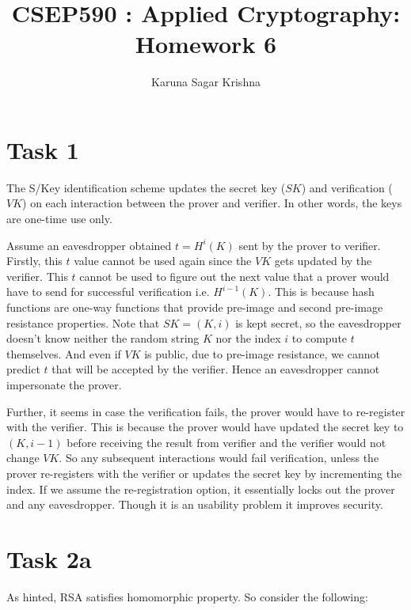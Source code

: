 \documentclass{article}
\title{CSEP590 : Applied Cryptography: Homework 6}
\author{Karuna Sagar Krishna}
\begin{document}
    \maketitle

    \section*{Task 1}
    The S/Key identification scheme updates the secret key ($SK$) and verification ($VK$) on each interaction between the prover and verifier. In other words, the keys are one-time use only.
    
    Assume an eavesdropper obtained $t = H^{i}(K)$ sent by the prover to verifier. Firstly, this $t$ value cannot be used again since the $VK$ gets updated by the verifier. This $t$ cannot be used to figure out the next value that a prover would have to send for successful verification i.e. $H^{i-1}(K)$. This is because hash functions are one-way functions that provide pre-image and second pre-image resistance properties. Note that $SK = (K, i)$ is kept secret, so the eavesdropper doesn't know neither the random string $K$ nor the index $i$ to compute $t$ themselves. And even if $VK$ is public, due to pre-image resistance, we cannot predict $t$ that will be accepted by the verifier. Hence an eavesdropper cannot impersonate the prover.

    Further, it seems in case the verification fails, the prover would have to re-register with the verifier. This is because the prover would have updated the secret key to $(K, i-1)$ before receiving the result from verifier and the verifier would not change $VK$. So any subsequent interactions would fail verification, unless the prover re-registers with the verifier or updates the secret key by incrementing the index. If we assume the re-registration option, it essentially locks out the prover and any eavesdropper. Though it is an usability problem it improves security.

    \section*{Task 2a}
    As hinted, RSA satisfies homomorphic property. So consider the following:
\end{document}
